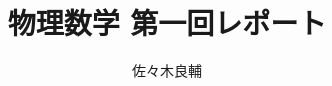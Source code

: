 \documentclass[uplatex,a4j,11pt]{jsarticle}
\begin{document}
\title{物理数学 第一回レポート}
\author{佐々木良輔}
\maketitle


\end{document}
